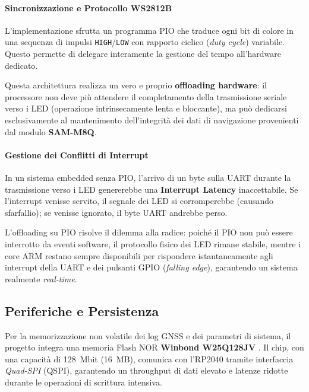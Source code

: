 \paragraph{Sincronizzazione e Protocollo WS2812B}

L'implementazione sfrutta un programma PIO che traduce ogni bit di colore in una sequenza di impulsi \texttt{HIGH}/\texttt{LOW} con rapporto ciclico (\textit{duty cycle}) variabile. Questo permette di delegare interamente la gestione del tempo all'hardware dedicato.

Questa architettura realizza un vero e proprio \textbf{offloading hardware}: il processore non deve più attendere il completamento della trasmissione seriale verso i LED (operazione intrinsecamente lenta e bloccante), ma può dedicarsi esclusivamente al mantenimento dell'integrità dei dati di navigazione provenienti dal modulo \textbf{SAM-M8Q}.

\paragraph{Gestione dei Conflitti di Interrupt}

In un sistema embedded senza PIO, l'arrivo di un byte sulla UART durante la trasmissione verso i LED genererebbe una \textbf{Interrupt Latency} inaccettabile. Se l'interrupt venisse servito, il segnale dei LED si corromperebbe (causando sfarfallio); se venisse ignorato, il byte UART andrebbe perso. 



L'offloading su PIO risolve il dilemma alla radice: poiché il PIO non può essere interrotto da eventi software, il protocollo fisico dei LED rimane stabile, mentre i core ARM restano sempre disponibili per rispondere istantaneamente agli interrupt della UART e dei pulsanti GPIO (\textit{falling edge}), garantendo un sistema realmente \textit{real-time}.

\subsection{Periferiche e Persistenza}

Per la memorizzazione non volatile dei log GNSS e dei parametri di sistema, il progetto integra una memoria Flash NOR \textbf{Winbond W25Q128JV} \cite{w25q128_ds}. Il chip, con una capacità di \qty{128}{Mbit} (\qty{16}{MB}), comunica con l'RP2040 tramite interfaccia \textit{Quad-SPI} (QSPI), garantendo un throughput di dati elevato e latenze ridotte durante le operazioni di scrittura intensiva.

